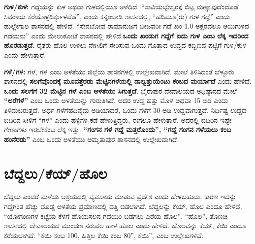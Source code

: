 \textbf{ಗುಳ/ಕುಳ:} ಗದ್ದೆಯನ್ನು ಕುಳ ಅಥವಾ ಗುಳದಲ್ಲಿಯೂ ಅಳೆದಿದೆ. “ಸಾವಿಯಬ್ಬೇಸ್ವರಕ್ಕೆ ಬಿಟ್ಟ ಮಣ್ನಾವುದೆಂದೊಡೆ ಸಿವರಾಯ ಕೆರೆಯೊಳ್ಪದಿರ್ಕ್ಕುಳವೆಡೆ”, ಎಂದು ಕನ್ನಂಬಾಡಿ ಶಾಸನದಲ್ಲಿ, “ಹದಿಮೂ(ರು) ಗುಳ ಗದ್ದೆ” ಎಂದು ಹುಲ್ಲೇಗಾಲ ಶಾಸನದಲ್ಲಿ ಹೇಳಿದೆ. “ಸೇನಬೋವ ರಾಮಾನುಜಗೆ ಬೀಜವರೀ ಗದೆ ಖಂ 1.0 ಅಕ್ಷರದಲೂ ಆಯಿಗುಳದ ಗದೆಯನು” ಎಂದು ಮೇಲುಕೋಟೆ ಶಾಸನದಲ್ಲಿ ಹೇಳಿದೆ.\textbf{ಒಂದು ಖಂಡುಗ ಗದ್ದೆಗೆ ಐದು ಗುಳ ಎಂಬ ಲೆಕ್ಕ ಇದರಿಂದ ಹೊರಡುತ್ತದೆ.} ರೈತರು ಹೊಲ ಉಳಲು ನೇಗಿಲಿಗೆ ಸೇರಿಸುವ ಒಂದು ಗೊತ್ತಾದ ಉದ್ದದ ಕಬ್ಬಿಣದ ಪಟ್ಟಿಗೆ ಗುಳ/ಕುಳ ಎಂದು ಹೇಳುತ್ತಾರೆ.

\textbf{ಗಳೆ/ಗಳ:} ಗಳೆ, ಗಳ ಎಂಬ ಅಳತೆಯು ಜಿಲ್ಲೆಯ ಶಾಸನಗಳಲ್ಲಿ ಉಲ್ಲೇಖವಾಗಿದೆ. ಮೇಲೆ ತಿಳಿಸಿದಂತೆ ಬೆಳ್ಳೂರು ಶಾಸನದಲ್ಲಿ \textbf{ಸಲಗೆವೊಂದಕ್ಕೆ ಮೂವತ್ತೆರಡು ಮೆಟ್ಟಿನಗಳೆಯಲ್ಲಿ ನಾಲ್ವತ್ತುಯೆಂಟು ಕಂಬದ ಮರ್ಯಾದೆ} ಎಂದು ಹೇಳಿದೆ. \textbf{ಒಂದು ಸಲಗೆಗೆ 32 ಮೆಟ್ಟಿನ ಗಳೆ ಎಂಬ ಅಳತೆಯು ಸಿಗುತ್ತದೆ}. ಭೈರಾಪುರ ದೇವಾಲಯದ ಅಧಿಷ್ಠಾನದ ಮೇಲೆ \textbf{“ಅರೆಗಳೆ”} ಎಂಬ ಒಂದು ಅಳತೆಯನ್ನು ಗುರುತಿಸಿದೆ. ಅದರ ಉದ್ದ ಹತ್ತು ಮೊಳ ಅಥವಾ 15 ಅಡಿ ಎಂದು ತಿಳಿದುಬರುತ್ತದೆ. ಅರ್ಧ ಗಳೆಗೆ\break ಹದಿನೈದು ಅಡಿಯಾದರೆ, ಒಂದು ಗಳೆಗೆ 30 ಅಡಿ ಉದ್ದವಾಗುತ್ತದೆ. ನಿರ್ದಿಷ್ಟ ಉದ್ದದ ಬಿದಿರಿನ ಸೀಳಿಗೆ “ಗಳ” ಎಂದು ಹಳ್ಳಿಗಳ ಕಡೆ ಹೇಳುತ್ತಿದ್ದರು, ಈಗಲೂ ಹೇಳುತ್ತಾರೆ. ಅದರಲ್ಲಿ ಬಿದಿರಿನ ಇಷ್ಟೇ ಗೇಣುಗಳು ಇರಬೇಕೆಂಬ ಲೆಕ್ಕ ಇತ್ತು. \textbf{“ಗಂಗನ ಗಳೆ ಗದ್ದೆ ಮತ್ತರೊಂದು”, “ಗದ್ದೆ ಗಂಗನ ಗಳೆಯಲು ಕಂಬ ಹಂನೆರಡು”} ಎಂಬ ಒಂದು ಅಳತೆಯು ಅಮೃತಾಪುರ ಶಾಸನದಲ್ಲಿ ಉಲ್ಲೇಖವಾಗಿದೆ.


\section{ಬೆದ್ದಲು/ಕೆಯ್​/ಹೊಲ}

ಬೆದ್ದಲು ಎಂದರೆ ಮಳೆಯ ಆಶ್ರಯದಲ್ಲಿ ವ್ಯವಸಾಯ ಮಾಡುವ ಪ್ರದೇಶ ಎಂದು ಹೇಳಬಹುದು. ಕಾರಣ ಇದನ್ನು ಗದ್ದೆಗಿಂತ ಹೆಚ್ಚು ದೊಡ್ಡ ಅಳತೆಯ ಪ್ರಮಾಣದಲ್ಲಿ ದತ್ತಿ ಬಿಡಲಾಗಿದೆ. ಬೆದ್ದಲನ್ನು ಕೆಯ್​, ಹೊಲ ಎಂದೂ ಹೇಳಿದೆ. “ಯೋಗಂಣಗಳ ಕಟ್ಟೆಯ ಕೆಳಗೆ ಹೊಯಸಲನ ಗದೆಯಿಂ ಬಡಗಲು ಎರೆಯ ಹೊಲ”, “ಹೊಲ”, ತೊಣಚಿ ಶಾಸನದಲ್ಲಿ ದೇವಾಲಯದ ಮುಂದಣ ನರುವಲ ಹಾಳ ಹೊಲ ಎಂದು ಹೇಳಿದೆ. ಹೊಲವನ್ನು ಕೆಯ್​, ಕೆಯಿ ಎಂದೂ ಕರೆಯಲಾಗಿದೆ. “ಕೆಯಿ ಕಂಬ 100, ಹಿತ್ತಿಲ ಕೆಯಿ ಕಂಬ 80”, ಕೆಯಿ”, ಎಂಬ ಉಲ್ಲೇಖಗಳಿವೆ.

